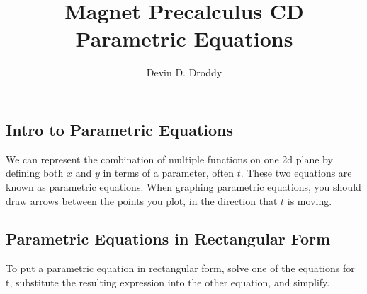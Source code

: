 \documentclass{report}
\title{\Huge{Magnet Precalculus CD} \\ Parametric Equations}
\author{\huge{Devin D. Droddy}}
\date{}
\begin{document}
\maketitle
\newpage%
\tableofcontents
\pagebreak

\chapter{}
\section{Intro to Parametric Equations}

We can represent the combination of multiple functions on one 2d plane by defining both $x$ and $y$ in terms of a parameter, often $t$. These two equations are known as parametric equations. When graphing parametric equations, you should draw arrows between the points you plot, in the direction that $t$ is moving.

%            

\section{Parametric Equations in Rectangular Form}

To put a parametric equation in rectangular form, solve one of the equations for t, substitute the resulting expression into the other equation, and simplify.

\end{document}
